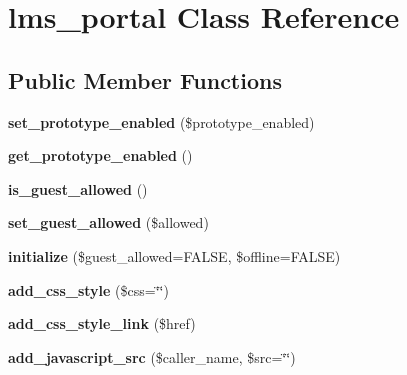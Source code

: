 \hypertarget{classlms__portal}{
\section{lms\_\-portal Class Reference}
\label{classlms__portal}
}
\subsection*{Public Member Functions}
\begin{DoxyCompactItemize}
\item 
\hypertarget{classlms__portal_a05fb42695720dca3eb3690a71152ece2}{
{\bfseries set\_\-prototype\_\-enabled} (\$prototype\_\-enabled)}
\label{classlms__portal_a05fb42695720dca3eb3690a71152ece2}

\item 
\hypertarget{classlms__portal_a0083682bff60f0791e97a112cb5432a9}{
{\bfseries get\_\-prototype\_\-enabled} ()}
\label{classlms__portal_a0083682bff60f0791e97a112cb5432a9}

\item 
\hypertarget{classlms__portal_afb681b7c8f8ff44199d87ea563849417}{
{\bfseries is\_\-guest\_\-allowed} ()}
\label{classlms__portal_afb681b7c8f8ff44199d87ea563849417}

\item 
\hypertarget{classlms__portal_aa15f2ac6e43dd7fecc25913197a29292}{
{\bfseries set\_\-guest\_\-allowed} (\$allowed)}
\label{classlms__portal_aa15f2ac6e43dd7fecc25913197a29292}

\item 
\hypertarget{classlms__portal_a549579dfa68b6b32fdbaa5f264fad3ae}{
{\bfseries initialize} (\$guest\_\-allowed=FALSE, \$offline=FALSE)}
\label{classlms__portal_a549579dfa68b6b32fdbaa5f264fad3ae}

\item 
\hypertarget{classlms__portal_a08bfb25735492011a275e1395ed6b266}{
{\bfseries add\_\-css\_\-style} (\$css=\char`\"{}\char`\"{})}
\label{classlms__portal_a08bfb25735492011a275e1395ed6b266}

\item 
\hypertarget{classlms__portal_a5b8fd73a1fdf136421840455bd6bb3d3}{
{\bfseries add\_\-css\_\-style\_\-link} (\$href)}
\label{classlms__portal_a5b8fd73a1fdf136421840455bd6bb3d3}

\item 
\hypertarget{classlms__portal_aea6964c9467b1157376cbcab4417dc91}{
{\bfseries add\_\-javascript\_\-src} (\$caller\_\-name, \$src=\char`\"{}\char`\"{})}
\label{classlms__portal_aea6964c9467b1157376cbcab4417dc91}


\end{DoxyCompactItemize}
